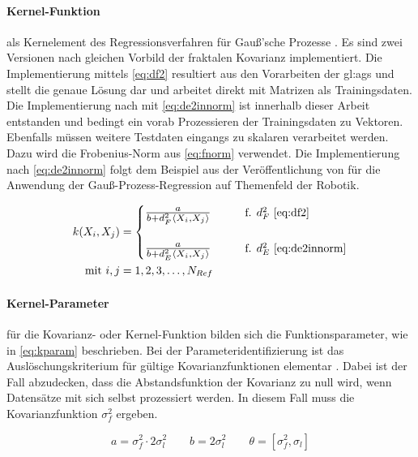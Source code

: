 \paragraph*{Kernel-Funktion} als Kernelement des Regressionsverfahren für Gauß'sche Prozesse \cite{Rasmussen2006}. Es sind zwei Versionen nach gleichen Vorbild der fraktalen Kovarianz \cite{Schuethe2020b}\cite{Schuethe2020}  implementiert. Die Implementierung mittels \autoref{eq:df2} resultiert aus den Vorarbeiten der \gls{gl:ags} und stellt die genaue Lösung dar und arbeitet direkt mit Matrizen als Trainingsdaten. Die Implementierung nach mit \autoref{eq:de2innorm} ist innerhalb dieser Arbeit entstanden und bedingt ein vorab Prozessieren der Trainingsdaten zu Vektoren. Ebenfalls müssen weitere Testdaten eingangs zu skalaren verarbeitet werden. Dazu wird die Frobenius-Norm aus \autoref{eq:fnorm} verwendet. Die Implementierung nach \autoref{eq:de2innorm} folgt dem Beispiel aus der Veröffentlichung von \citeauthor{Lang2014}\cite{Lang2014} für die Anwendung der Gauß-Prozess-Regression auf Themenfeld der Robotik.


\begin{align}\label{eq:kfun}
	k(X_i, X_j) &= 
		\begin{cases}
			\resizebox{.17\linewidth}{!}{$\frac{a}{b + d_F^2\langle X_i, X_j \rangle}$} &\qquad \text{f. } d_F^2 \text{ \eqref{eq:df2}} \\\\
			\resizebox{.17\linewidth}{!}{$\frac{a}{b + d_E^2\langle X_i, X_j \rangle}$} &\qquad \text{f. } d_E^2 \text{ \eqref{eq:de2innorm}}
		\end{cases} \\
\text{mit } i,j &= 1,2,3,\ldots,N_{Ref} \nonumber
\end{align}


\clearpage


\paragraph*{Kernel-Parameter} für die Kovarianz- oder Kernel-Funktion bilden sich die Funktionsparameter, wie in \autoref{eq:kparam} beschrieben. Bei der Parameteridentifizierung ist das Auslöschungskriterium für gültige Kovarianzfunktionen elementar \cite{Rasmussen2006}. Dabei ist der Fall abzudecken, dass die Abstandsfunktion der Kovarianz zu null wird, wenn Datensätze mit sich selbst prozessiert werden. In diesem Fall muss die Kovarianzfunktion $\sigma_f^2$ ergeben.


\begin{equation}\label{eq:kparam}
	a = \sigma_f^2 \cdot 2 \sigma_l^2 \qquad b = 2 \sigma_l^2 \qquad \theta = \left[\sigma_f^2, \sigma_l\right]
\end{equation}


